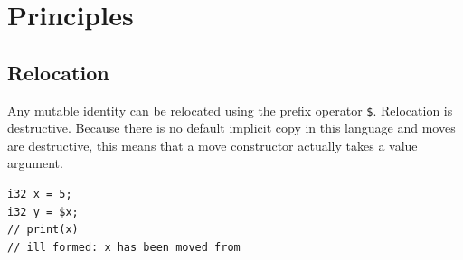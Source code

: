 \chapter{Principles}


\section{Relocation}
\para Any mutable identity can be relocated using the prefix operator \texttt{\$}.
\para Relocation is destructive.
\para Because there is no default implicit copy in this language and moves are destructive, this means that a move constructor actually takes a value argument.
\begin{verbatim}
i32 x = 5;
i32 y = $x;
// print(x)
// ill formed: x has been moved from
\end{verbatim}